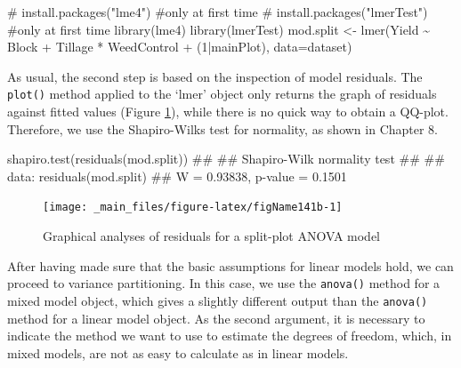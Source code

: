 \documentclass[a4paper,12pt,oneside]{book}
\newenvironment{Shaded}{\begin{snugshade}}{\end{snugshade}}
\newcommand{\DecValTok}[1]{#1}
\newcommand{\SpecialCharTok}[1]{#1}
\newcommand{\CommentTok}[1]{#1}
\newcommand{\DocumentationTok}[1]{#1}
\newcommand{\OtherTok}[1]{#1}
\newcommand{\FunctionTok}[1]{#1}
\newcommand{\AttributeTok}[1]{#1}
\newcommand{\NormalTok}[1]{#1}
\begin{document}
\begin{Shaded}
\begin{Highlighting}[]
\CommentTok{\# install.packages("lme4")  \#only at first time}
\CommentTok{\# install.packages("lmerTest")  \#only at first time}
\FunctionTok{library}\NormalTok{(lme4)}
\FunctionTok{library}\NormalTok{(lmerTest)}
\NormalTok{mod.split }\OtherTok{\textless{}{-}} \FunctionTok{lmer}\NormalTok{(Yield }\SpecialCharTok{\textasciitilde{}}\NormalTok{ Block }\SpecialCharTok{+}\NormalTok{ Tillage }\SpecialCharTok{*}\NormalTok{ WeedControl }\SpecialCharTok{+}
\NormalTok{                  (}\DecValTok{1}\SpecialCharTok{|}\NormalTok{mainPlot), }\AttributeTok{data=}\NormalTok{dataset)}
\end{Highlighting}
\end{Shaded}

As usual, the second step is based on the inspection of model residuals. The \texttt{plot()} method applied to the `lmer' object only returns the graph of residuals against fitted values (Figure \ref{fig:figName141b}), while there is no quick way to obtain a QQ-plot. Therefore, we use the Shapiro-Wilks test for normality, as shown in Chapter 8.

\begin{Shaded}
\begin{Highlighting}[]
\FunctionTok{shapiro.test}\NormalTok{(}\FunctionTok{residuals}\NormalTok{(mod.split))}
\DocumentationTok{\#\# }
\DocumentationTok{\#\#  Shapiro{-}Wilk normality test}
\DocumentationTok{\#\# }
\DocumentationTok{\#\# data:  residuals(mod.split)}
\DocumentationTok{\#\# W = 0.93838, p{-}value = 0.1501}
\end{Highlighting}
\end{Shaded}

\begin{figure}

{\centering \texttt{[image: \_main\_files/figure-latex/figName141b-1]} 

}

\caption{Graphical analyses of residuals for a split-plot ANOVA model}\label{fig:figName141b}
\end{figure}

After having made sure that the basic assumptions for linear models hold, we can proceed to variance partitioning. In this case, we use the \texttt{anova()} method for a mixed model object, which gives a slightly different output than the \texttt{anova()} method for a linear model object. As the second argument, it is necessary to indicate the method we want to use to estimate the degrees of freedom, which, in mixed models, are not as easy to calculate as in linear models.
\end{document}
